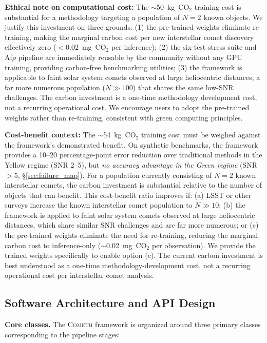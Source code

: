 \documentclass[usenatbib]{mnras}
\begin{document}
\textbf{Ethical note on computational cost:} The $\sim$50~kg~CO$_2$ training cost is substantial for a methodology targeting a population of $N=2$ known objects. We justify this investment on three grounds: (1) the pre-trained weights eliminate re-training, making the marginal carbon cost per new interstellar comet discovery effectively zero ($<0.02$~mg~CO$_2$ per inference); (2) the six-test stress suite and Af$\rho$ pipeline are immediately reusable by the community without any GPU training, providing carbon-free benchmarking utilities; (3) the framework is applicable to faint solar system comets observed at large heliocentric distances, a far more numerous population ($N \gg 100$) that shares the same low-SNR challenges. The carbon investment is a one-time methodology development cost, not a recurring operational cost. We encourage users to adopt the pre-trained weights rather than re-training, consistent with green computing principles.

\textbf{Cost-benefit context:} The $\sim$54~kg~CO$_2$ training cost must be weighed against the framework's demonstrated benefit. On synthetic benchmarks, the framework provides a 10--20 percentage-point error reduction over traditional methods in the Yellow regime (SNR 2--5), but \textit{no accuracy advantage in the Green regime} (SNR $>$5, \S\ref{sec:failure_map}). For a population currently consisting of $N=2$ known interstellar comets, the carbon investment is substantial relative to the number of objects that can benefit. This cost-benefit ratio improves if: (a) LSST or other surveys increase the known interstellar comet population to $N \gg 10$; (b) the framework is applied to faint solar system comets observed at large heliocentric distances, which share similar SNR challenges and are far more numerous; or (c) the pre-trained weights eliminate the need for re-training, reducing the marginal carbon cost to inference-only ($\sim$0.02~mg~CO$_2$ per observation). We provide the trained weights specifically to enable option (c). The current carbon investment is best understood as a one-time methodology-development cost, not a recurring operational cost per interstellar comet analysis.

\subsection{Software Architecture and API Design}\label{sec:api}

\textbf{Core classes.} The \textsc{Cometh} framework is organized around three primary classes corresponding to the pipeline stages:
\end{document}
